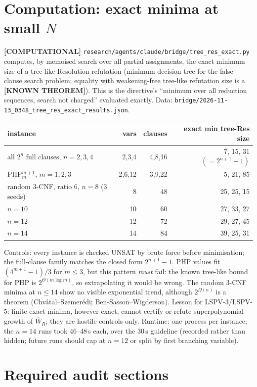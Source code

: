 \documentclass[11pt]{article}
\theoremstyle{definition}
\theoremstyle{remark}
\newcommand{\Wb}{\overline W}
\newcommand{\status}[1]{\textbf{[#1]}}
\begin{document}
\section{Computation: exact minima at small $N$}

\status{COMPUTATIONAL} \texttt{research/agents/claude/bridge/tree\_res\_exact.py} computes, by memoised search
over all partial assignments, the exact minimum size of a tree-like Resolution refutation (minimum decision
tree for the false-clause search problem; equality with weakening-free tree-like refutation size is a
\status{KNOWN THEOREM}). This is the directive's ``minimum over all reduction sequences, search not charged''
evaluated exactly. Data: \texttt{bridge/2026-11-13\_0348\_tree\_res\_exact\_results.json}.

\begin{center}
\begin{tabular}{lrrr}
instance & vars & clauses & exact min tree-Res size\\\hline
all $2^n$ full clauses, $n=2,3,4$ & 2,3,4 & 4,8,16 & 7, 15, 31 $(=2^{n+1}-1)$\\
PHP$^{m+1}_m$, $m=1,2,3$ & 2,6,12 & 3,9,22 & 5, 21, 85\\
random 3-CNF, ratio 6, $n=8$ (3 seeds) & 8 & 48 & 25, 25, 15\\
\quad $n=10$ & 10 & 60 & 27, 33, 27\\
\quad $n=12$ & 12 & 72 & 29, 27, 45\\
\quad $n=14$ & 14 & 84 & 39, 25, 31\\
\end{tabular}
\end{center}

Controls: every instance is checked UNSAT by brute force before minimisation; the full-clause family matches
the closed form $2^{n+1}-1$. PHP values fit $(4^{m+1}-1)/3$ for $m\le3$, but this pattern \emph{must} fail:
the known tree-like bound for PHP is $2^{\Theta(m\log m)}$, so extrapolating it would be wrong. The random
3-CNF minima at $n\le14$ show no visible exponential trend, although $2^{\Omega(n)}$ is a theorem
(Chv\'atal--Szemer\'edi; Ben-Sasson--Wigderson). Lesson for LSPV-3/LSPV-5: finite exact minima, however
exact, cannot certify or refute superpolynomial growth of $\Wb_R$; they are hostile controls only.
Runtime: one process per instance; the $n=14$ runs took 46--48\,s each, over the 30\,s guideline
(recorded rather than hidden; future runs should cap at $n=12$ or split by first branching variable).

\section{Required audit sections}
\end{document}
